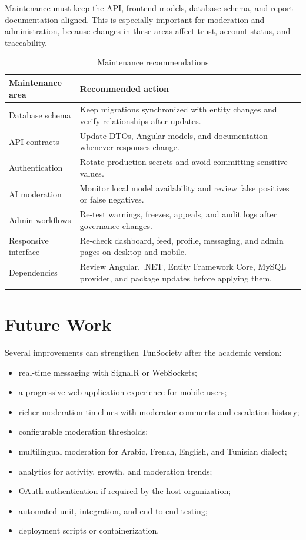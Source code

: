 Maintenance must keep the API, frontend models, database schema, and report documentation aligned. This is especially important for moderation and administration, because changes in these areas affect trust, account status, and traceability.

\begin{longtable}{|m{3.8cm}|m{9.8cm}|}
\hline
\textbf{Maintenance area} & \textbf{Recommended action} \\
\hline
Database schema & Keep migrations synchronized with entity changes and verify relationships after updates. \\
\hline
API contracts & Update DTOs, Angular models, and documentation whenever responses change. \\
\hline
Authentication & Rotate production secrets and avoid committing sensitive values. \\
\hline
AI moderation & Monitor local model availability and review false positives or false negatives. \\
\hline
Admin workflows & Re-test warnings, freezes, appeals, and audit logs after governance changes. \\
\hline
Responsive interface & Re-check dashboard, feed, profile, messaging, and admin pages on desktop and mobile. \\
\hline
Dependencies & Review Angular, .NET, Entity Framework Core, MySQL provider, and package updates before applying them. \\
\hline
\caption{Maintenance recommendations}
\end{longtable}

\section{Future Work}

Several improvements can strengthen TunSociety after the academic version:

\begin{itemize}
    \item real-time messaging with SignalR or WebSockets;
    \item a progressive web application experience for mobile users;
    \item richer moderation timelines with moderator comments and escalation history;
    \item configurable moderation thresholds;
    \item multilingual moderation for Arabic, French, English, and Tunisian dialect;
    \item analytics for activity, growth, and moderation trends;
    \item OAuth authentication if required by the host organization;
    \item automated unit, integration, and end-to-end testing;
    \item deployment scripts or containerization.
\end{itemize}

